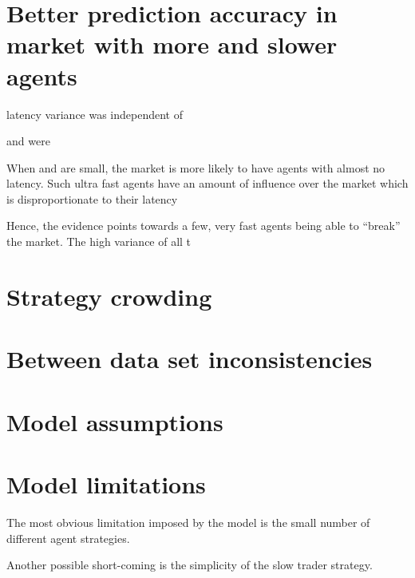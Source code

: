 \section{Better prediction accuracy in market with more and slower agents}
latency variance was independent of 

\ssmmlatencys and \sclatencys were 

When \ssmmlatencymu{} and \sclatencymu{} are small, the market is more likely to have agents with almost no latency. Such ultra fast agents have an amount of influence over the market which is disproportionate to their latency


Hence, the evidence points towards a few, very fast agents being able to ``break'' the market.
The high variance of all t


\section{Strategy crowding}

\section{Between data set inconsistencies}

\section{Model assumptions}

\section{Model limitations}
The most obvious limitation imposed by the model is the small number of different agent strategies.

Another possible short-coming is the simplicity of the slow trader strategy. 
